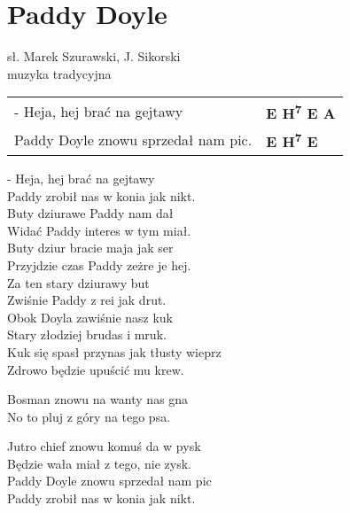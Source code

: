 \section{Paddy Doyle}

sł. Marek Szurawski, J. Sikorski\\
muzyka tradycyjna

\vspace{1em}
\begin{tabular}{@{}p{7cm}@{}l@{}}
- Heja, hej brać na gejtawy & \bfseries E H\textsuperscript{7} E A\\
Paddy Doyle znowu sprzedał nam pic. & \bfseries E H\textsuperscript{7} E\\
\end{tabular}

\vspace{1em}
- Heja, hej brać na gejtawy \\
Paddy zrobił nas w konia jak nikt. \\

Buty dziurawe Paddy nam dał \\
Widać Paddy interes w tym miał. \\

Buty dziur bracie maja jak ser \\
Przyjdzie czas Paddy zeżre je hej. \\

Za ten stary dziurawy but \\
Zwiśnie Paddy z rei jak drut. \\

Obok Doyla zawiśnie nasz kuk \\
Stary złodziej brudas i mruk. \\

Kuk się spasł przynas jak tłusty wieprz \\
Zdrowo będzie upuścić mu krew. \\

\begin{multicols}{2}
Bosman znowu na wanty nas gna \\
No to pluj z góry na tego psa. \\
\newcolumn

Jutro chief znowu komuś da w pysk \\
Będzie wała miał z tego, nie zysk. \\

Paddy Doyle znowu sprzedał nam pic \\
Paddy zrobił nas w konia jak nikt.
\end{multicols}